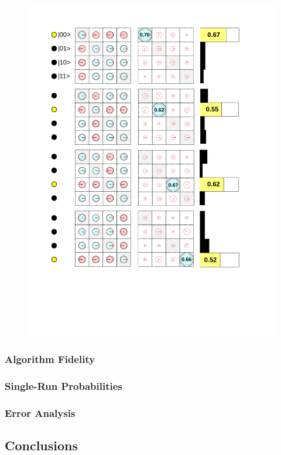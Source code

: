\begin{figure}
	\centering
		\includegraphics[width=1.\textwidth]{./material/papers/grover/figures/grover_algorithm_experimental_results}
	\label{fig:GroverAlgorithmExperimentalResults}
	\caption{}
\end{figure}

\subsubsection{Algorithm Fidelity}


\subsubsection{Single-Run Probabilities}

\subsubsection{Error Analysis}

\subsection{Conclusions}

